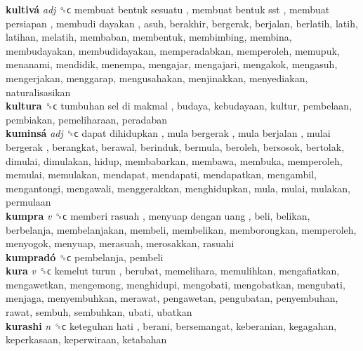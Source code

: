 \textbf{kultivá} \emph{adj}  ␝ϲ   membuat bentuk sesuatu ,  membuat bentuk sst ,  membuat persiapan ,  membudi dayakan , asuh, berakhir, bergerak, berjalan, berlatih, latih, latihan, melatih, membaban, membentuk, membimbing, membina, membudayakan, membudidayakan, memperadabkan, memperoleh, memupuk, menanami, mendidik, menempa, mengajar, mengajari, mengakok, mengasuh, mengerjakan, menggarap, mengusahakan, menjinakkan, menyediakan, naturalisasikan  \\
\textbf{kultura} ␝ϲ   tumbuhan sel di makmal , budaya, kebudayaan, kultur, pembelaan, pembiakan, pemeliharaan, peradaban  \\
\textbf{kuminsá} \emph{adj}  ␝ϲ   dapat dihidupkan ,  mula bergerak ,  mula berjalan ,  mulai bergerak , berangkat, berawal, berinduk, bermula, beroleh, bersosok, bertolak, dimulai, dimulakan, hidup, membabarkan, membawa, membuka, memperoleh, memulai, memulakan, mendapat, mendapati, mendapatkan, mengambil, mengantongi, mengawali, menggerakkan, menghidupkan, mula, mulai, mulakan, permulaan  \\
\textbf{kumpra} \emph{v}  ␝ϲ   memberi rasuah ,  menyuap dengan uang , beli, belikan, berbelanja, membelanjakan, membeli, membelikan, memborongkan, memperoleh, menyogok, menyuap, merasuah, merosakkan, rasuahi  \\
\textbf{kumpradó} ␝ϲ  pembelanja, pembeli  \\
\textbf{kura} \emph{v}  ␝ϲ   kemelut turun , berubat, memelihara, memulihkan, mengafiatkan, mengawetkan, mengemong, menghidupi, mengobati, mengobatkan, mengubati, menjaga, menyembuhkan, merawat, pengawetan, pengubatan, penyembuhan, rawat, sembuh, sembuhkan, ubati, ubatkan  \\
\textbf{kurashi} \emph{n}  ␝ϲ   keteguhan hati , berani, bersemangat, keberanian, kegagahan, keperkasaan, keperwiraan, ketabahan  \\
